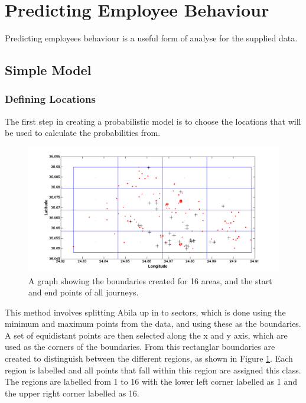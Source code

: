 \section{Predicting Employee Behaviour}
\label{sec:predicting}

Predicting employees behaviour is a useful form of analyse for the supplied data.  

\subsection{Simple Model}
\label{sec:simplemodel}
\subsubsection{Defining Locations}
The first step in creating a probabilistic model is to choose the locations that will be used to calculate the probabilities from. \\
\begin{figure}[H]
\centering
\includegraphics[width=1\textwidth]{locationbound.png}
\caption{\label{fig:locationbound}A graph showing the boundaries created for 16 areas, and the start and end points of all journeys. }

\end{figure}
\noindent This method involves splitting Abila up in to sectors, which is done using the minimum and maximum points from the data, and using these as the boundaries. A set of equidistant points are then selected along the x and y axis, which are used as the corners of the boundaries. From this rectanglar boundaries are created to distinguish between the different regions, as shown in Figure \ref{fig:locationbound}. Each region is labelled and all points that fall within this region are assigned this class. The regions are labelled from 1 to 16 with the lower left corner labelled as 1 and the upper right corner labelled as 16. 

